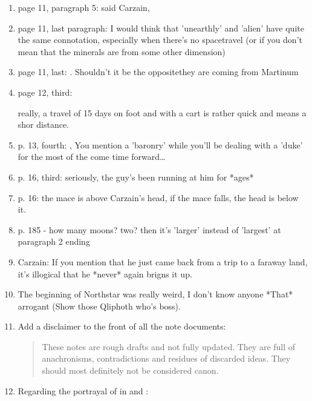 \begin{enumerate}
  \item 
    page 11, paragraph 5: 
     said Carzain, 
  \item 
    page 11, last paragraph:  I would think that 'unearthly' and 'alien' have quite the same connotation, especially when there's no spacetravel (or if you don't mean that the minerals are from some other dimension)
  \item 
    page 11, last: 
    .  Shouldn't it be the opposite\dash they are coming from Martinum
  \item 
    page 12, third: 
    
    really, a travel of 15 days on foot and with a cart is rather quick and means a shor distance.
  \item 
    p. 13, fourth: , You mention a 'baronry' while you'll be dealing with a 'duke' for the most of the come time forward\ldots{} 
  \item 
    p. 16, third:  seriously, the guy's been running at him for *ages*
  \item 
    p. 16: the mace is above Carzain's head, if the mace falls, the head is below it.
  \item 
    p. 185 - how many moons? two? then it's 'larger' instead of 'largest' at paragraph 2 ending
  \item 
    Carzain: If you mention that he just came back from a trip to a faraway land, it's illogical that he *never* again brigns it up. 
  \item 
    The beginning of Northstar was really weird, I don't know anyone *That* arrogant (Show those Qliphoth who's boss). 
  \item 
    Add a disclaimer to the front of all the note documents:
    \begin{quotation}
      These notes are rough drafts and not fully updated. 
      They are full of anachronisms, contradictions and residues of discarded ideas. 
      They should most definitely not be considered canon. 
    \end{quotation}
  \item 
    Regarding the portrayal of \resphain in  and : 
    

\end{enumerate}
